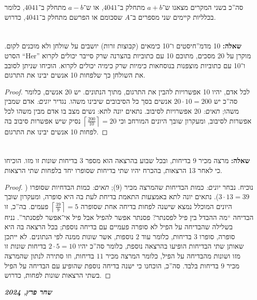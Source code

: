 \documentclass[]{article}
\newcommand\rc    {\right\rceil}
\newcommand\lc    {\left\lceil}
\begin{document}
	סה''כ בשני המקרים מצאנו ש־$a + b$ מתחלק ב־$4041$, או ש־$a - b$ מתחלק ב־$4041$, כלומר בכלליות קיימים שני מספרים ב־$A$ שסכומם או הפרשם מתחלק ב־$4041$, כדרוש. 
	
	\section{} %
	\textbf{שאלה: }10 מדמ''חיסטים ו־10 כימאים (קבוצות זרות) יושבים על שולחן ולא מוכנים לקום. הסרט ``Her'' מוקרן על 20 מסכים, מתוכם 10 עם כתוביות בהצרנה שרק סייבר יכולים לקרוא ו־10 עם כתוביות מוצפנות בנוסחאות כימיות שרק כימיה יכולים לקרוא. הוכיחו שניתן לסובב את השולחן כך שלפחות 10 אנשים יבינו את התרגום. 
	
	\begin{proof}
		לכל אדם, יהיו 10 אפשרויות להבין את התרגום, מתוך הנתונים. יש 20 אנשים, כלומר סה''כ יש $20 \cdot 10 = 200$ אנשים בסך כל הסיבובים שיבינו משהו. נגדיר \textit{יונים: }אדם שמבין משהו; \textit{תאים: }20 אפשרויות לסיבוב. נתאים יונה לתא: נשים מצב בו אדם מבין משהו לכל אפשרות לסיבוב, ומעקרון שובך היונים המורחב וכי $\lc \frac{200}{10} \rc = 20$ נסיק שיש אפשרות סיבוב בה לפחות 10 אנשים יבינו את התרגום. 
	\end{proof}
	\section{} %
	\textbf{שאלה: }מרצה מכיר 9 בדיחות, ובכל שבוע בהרצאה הוא מספר 3 בדיחות שונות זו מזו. הוכיחו כי לאחר 13 הרצאות, בהכרח יהיו שתי בדיחות שסופרו יחד בלפחות שתי הרצאות. 
	\begin{proof}
		נוכיח. נבחר \textit{יונים: }כמות הבדיחות שהמרצה מכיר ($9$); \textit{תאים: }כמות הבדחיות שסופרו ($ 3 \cdot 13 = 39 $). נתאים יונה לתא באמצעות התאמת בדיחת לעת בה היא סופרה, ומעקרון שובך היונים המוכלל נמצא שישנה לפחות בדיחה אחת שסופרה $ \lc \frac{39}{9} \rc = 5 $ פעמים. בה''כ, זו הבדיחה ``מה ההבדל בין פיל לפסנתר? פסנתר אפשר להפיל אבל פיל אי־אפשר לפסנתר''. נניח בשלילה שהבדיחה על הפיל לא סופרה פעמיים עם בדיחה נוספת; בכל הרצאה בה היא סופרה, סופרו $3$ בדיחות, כלומר עוד $2$ נוספות, אשר שונות ממנה לפי הנתונים. לא ייתכן שאותן שתי הבדיחות הופיעו בהרצאה נוספת, כלומר סה''כ יהיו $ 2 \cdot 5 = 10 $ בדיחות שונות זו מזו ושונות מהבדיחה על הפיל, כלומר המרצה מכיר $11$ בדיחות, וזו סתירה לנתון שהמרצה מכיר $9$ בדיחות בלבד. סה''כ, הוכחנו כי ישנה בדיחה נוספת שהופיע עם הבדיחה על הפיל בשתי הרצאות שונות לפחות, כדרוש. 
	\end{proof}
	
	\dotfill
	{\vfil \hfil \textbf{\textit{שחר פרץ, 2024}} \hfil \vfil}
	
\end{document}

